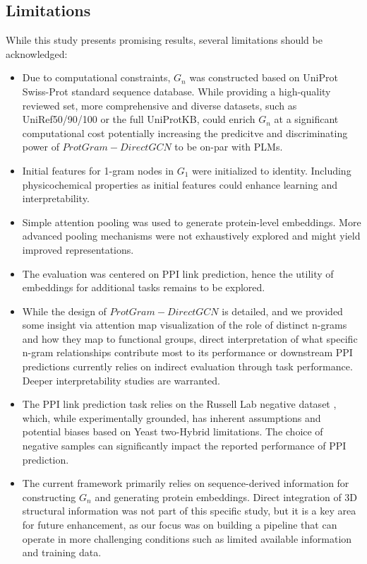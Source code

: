 \documentclass[utf8]{article}
\begin{document}
	\subsection{Limitations}
	While this study presents promising results, several limitations should be acknowledged:
	\begin{itemize}
		\item Due to computational constraints, $G_{n}$ was constructed based on UniProt Swiss-Prot standard sequence database. While providing a high-quality reviewed set, more comprehensive and diverse datasets, such as UniRef50/90/100 or the full UniProtKB, could enrich $G_{n}$ at a significant computational cost potentially increasing the predicitve and discriminating power of $ProtGram-DirectGCN$ to be on-par with PLMs.
		\item Initial features for 1-gram nodes in $G_{1}$ were initialized to identity. Including physicochemical properties as initial features could enhance learning and interpretability.
		\item Simple attention pooling was used to generate protein-level embeddings. More advanced pooling mechanisms were not exhaustively explored and might yield improved representations.
		\item The evaluation was centered on PPI link prediction, hence the utility of embeddings for additional tasks remains to be explored.
		\item While the design of $ProtGram-DirectGCN$ is detailed, and we provided some insight via attention map visualization of the role of distinct n-grams and how they map to functional groups, direct interpretation of what specific n-gram relationships contribute most to its performance or downstream PPI predictions currently relies on indirect evaluation through task performance. Deeper interpretability studies are warranted.
		\item The PPI link prediction task relies on the Russell Lab negative dataset \cite{trabuco_negativeproteinprotein_2012}, which, while experimentally grounded, has inherent assumptions and potential biases based on Yeast two-Hybrid limitations. The choice of negative samples can significantly impact the reported performance of PPI prediction.
		\item The current framework primarily relies on sequence-derived information for constructing $G_{n}$ and generating protein embeddings. Direct integration of 3D structural information was not part of this specific study, but it is a key area for future enhancement, as our focus was on building a pipeline that can operate in more challenging conditions such as limited available information and training data.
	\end{itemize}
	
\end{document}
